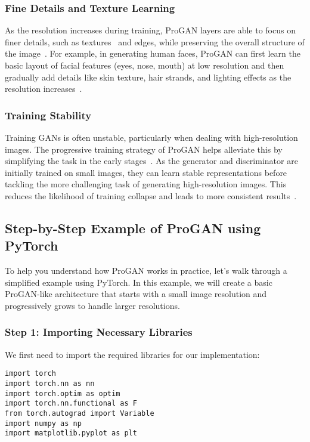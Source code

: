 \subsubsection{Fine Details and Texture Learning}
As the resolution increases during training, ProGAN layers are able to focus on finer details, such as textures~\cite{ma1996texture} and edges, while preserving the overall structure of the image~\cite{dundar2023fine}. For example, in generating human faces, ProGAN can first learn the basic layout of facial features (eyes, nose, mouth) at low resolution and then gradually add details like skin texture, hair strands, and lighting effects as the resolution increases~\cite{dundar2023fine}.

\subsubsection{Training Stability}
Training GANs is often unstable, particularly when dealing with high-resolution images. The progressive training strategy of ProGAN helps alleviate this by simplifying the task in the early stages~\cite{dundar2023fine}. As the generator and discriminator are initially trained on small images, they can learn stable representations before tackling the more challenging task of generating high-resolution images. This reduces the likelihood of training collapse and leads to more consistent results~\cite{pathak2018efficient}.

\subsection{Step-by-Step Example of ProGAN using PyTorch}
To help you understand how ProGAN works in practice, let's walk through a simplified example using PyTorch. In this example, we will create a basic ProGAN-like architecture that starts with a small image resolution and progressively grows to handle larger resolutions.

\subsubsection{Step 1: Importing Necessary Libraries}
We first need to import the required libraries for our implementation:

\begin{lstlisting}[style=python]
import torch
import torch.nn as nn
import torch.optim as optim
import torch.nn.functional as F
from torch.autograd import Variable
import numpy as np
import matplotlib.pyplot as plt
\end{lstlisting}

